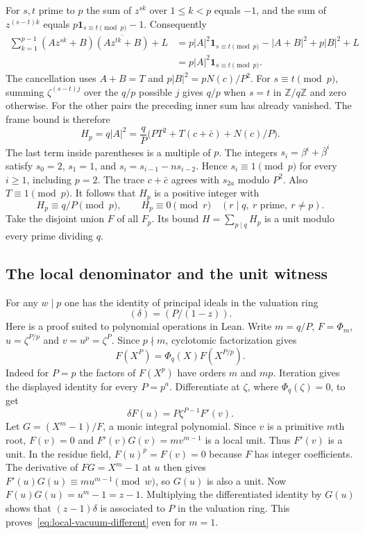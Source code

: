 \documentclass[11pt,letterpaper]{article}
\begin{document}
For $s,t$ prime to $p$ the sum of $z^{sk}$ over $1\leq k<p$ equals
$-1$, and the sum of $z^{(s-t)k}$ equals
$p\mathbf1_{s\equiv t\pmod p}-1$. Consequently
\begin{align*}
 \sum_{k=1}^{p-1}(Az^{sk}+B)\overline{(Az^{tk}+B)}+L
 &=p|A|^2\mathbf1_{s\equiv t\pmod p}
      -|A+B|^2+p|B|^2+L\\
 &=p|A|^2\mathbf1_{s\equiv t\pmod p}.
\end{align*}
The cancellation uses $A+B=T$ and $p|B|^2=pN(c)/P^2$.
For $s\equiv t\pmod p$, summing
$\zeta^{(s-t)j}$ over the $q/p$ possible $j$ gives $q/p$ when $s=t$
in $\mathbb Z/q\mathbb Z$ and zero otherwise. For the other pairs
the preceding inner sum has already vanished. The frame bound is therefore
\begin{equation}
 H_p=q|A|^2=\frac qP
       \bigl(PT^2+T(c+\bar c)+N(c)/P\bigr).
 \label{eq:punctured-frame-bound}
\end{equation}
The last term inside parentheses is a multiple of $p$. The integers
$s_i=\beta^i+\bar\beta^i$ satisfy $s_0=2$, $s_1=1$, and
$s_i=s_{i-1}-n s_{i-2}$. Hence $s_i\equiv1\pmod p$ for every
$i\geq1$, including $p=2$. The trace $c+\bar c$ agrees with
$s_{2a}$ modulo $P^2$. Also $T\equiv1\pmod p$. It follows that
$H_p$ is a positive integer with
\[
   H_p\equiv q/P\pmod p,\qquad H_p\equiv0\pmod r
            \quad(r\mid q,\ r\text{ prime},\ r\ne p).
\]
Take the disjoint union $F$ of all $F_p$. Its bound $H=\sum_{p\mid q}H_p$
is a unit modulo every prime dividing $q$.

\subsection{The local denominator and the unit witness}
For any $w\mid p$ one has the identity of principal ideals in the
valuation ring
\begin{equation}
         (\delta)=(P/(1-z)).
         \label{eq:local-vacuum-different}
\end{equation}
Here is a proof suited to polynomial operations in Lean. Write $m=q/P$,
$F=\Phi_m$, $u=\zeta^{P/p}$ and $v=u^p=\zeta^P$. Since $p\nmid m$,
cyclotomic factorization gives
\[
 F(X^P)=\Phi_q(X)F(X^{P/p}).
\]
Indeed for $P=p$ the factors of $F(X^p)$ have orders $m$ and $mp$.
Iteration gives the displayed identity for every $P=p^a$.
Differentiate at $\zeta$, where $\Phi_q(\zeta)=0$, to get
\[
             \delta F(u)=P\zeta^{P-1}F'(v).
\]
Let $G=(X^m-1)/F$, a monic integral polynomial. Since $v$ is a
primitive $m$th root, $F(v)=0$ and
$F'(v)G(v)=m v^{m-1}$ is a local unit. Thus $F'(v)$ is a unit.
In the residue field, $F(u)^p=F(v)=0$ because $F$ has integer
coefficients. The derivative of $FG=X^m-1$ at $u$ then gives
$F'(u)G(u)\equiv m u^{m-1}\pmod w$, so $G(u)$ is also a unit.
Now $F(u)G(u)=u^m-1=z-1$. Multiplying the differentiated identity by
$G(u)$ shows that $(z-1)\delta$ is associated to $P$ in the valuation
ring. This proves~\eqref{eq:local-vacuum-different} even for $m=1$.
\end{document}
